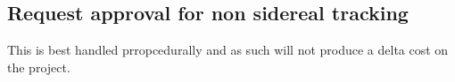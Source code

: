 
\subsection{Request approval for non sidereal tracking} \label{sec:7request}

This is best handled prropcedurally and as such will not produce a delta cost on the project.

